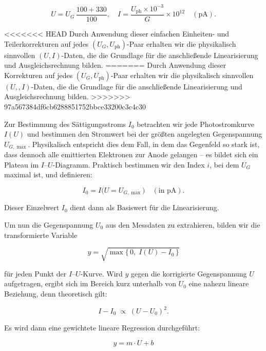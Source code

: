 \begin{equation}
  U = U_{G}\,\frac{100 + 330}{100},\quad
  I = \frac{U_{\mathrm{ph}}\times10^{-3}}{G}\times10^{12}
  \quad(\mathrm{pA}).
\end{equation}

<<<<<<< HEAD
Durch Anwendung dieser einfachen Einheiten- und Teilerkorrekturen auf jedes $(U_{G},U_{\mathrm{ph}})$-Paar erhalten wir die physikalisch sinnvollen $(U,I)$-Daten, die die Grundlage für die anschließende Linearisierung und Ausgleichsrechnung bilden.
=======
Durch Anwendung dieser Korrekturen auf jedes $(U_{G},U_{\mathrm{ph}})$-Paar erhalten wir die physikalisch sinnvollen $(U,,I)$-Daten, die die Grundlage für die anschließende Linearisierung und Ausgleichsrechnung bilden.
>>>>>>> 97a567384df6cb6288851752bbce33200c3c4c30

Zur Bestimmung des Sättigungsstroms $I_{0}$ betrachten wir jede Photostromkurve $I(U)$ und bestimmen den Stromwert bei der größten angelegten Gegenspannung $U_{G,\max}$. Physikalisch entspricht dies dem Fall, in dem das Gegenfeld so stark ist, dass dennoch alle emittierten Elektronen zur Anode gelangen – es bildet sich ein Plateau im $I$–$U$-Diagramm. Praktisch bestimmen wir den Index $i$, bei dem $U_{G}$ maximal ist, und definieren:

\begin{equation}
  I_{0} = I\bigl(U = U_{G,\max}\bigr)\quad(\text{in pA}).
\end{equation}

Dieser Einzelwert $I_{0}$ dient dann als Basiswert für die Linearisierung.

Um nun die Gegenspannung $U_{0}$ aus den Messdaten zu extrahieren, bilden wir die transformierte Variable

\begin{equation}
  y = \sqrt{\max\{\,0,\;I(U) - I_{0}\,\}}
\end{equation}

für jeden Punkt der $I$–$U$-Kurve. Wird $y$ gegen die korrigierte Gegenspannung $U$ aufgetragen, ergibt sich im Bereich kurz unterhalb von $U_{0}$ eine nahezu lineare Beziehung, denn theoretisch gilt:

\begin{equation}
  I - I_{0} \;\propto\;(U - U_{0})^{2}.
\end{equation}

Es wird dann eine gewichtete lineare Regression durchgeführt:

\begin{equation}
    y = m \cdot U + b
\end{equation}

